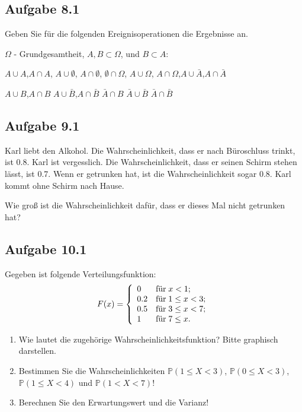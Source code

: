 \documentclass{article}
\begin{document}
	\subsection*{Aufgabe 8.1}
	Geben Sie für die folgenden Ereignisoperationen die Ergebnisse an.
	
	$\Omega$ - Grundgesamtheit, $A, B \subset \Omega$, und $B \subset A$:
	
	$A \cup A$,\quad $A \cap A$, \quad$A \cup \emptyset$, \quad $A \cap
	\emptyset$, \quad$\emptyset \cap \Omega$, \quad$A \cup \Omega$,\quad
	$A \cap \Omega$,\quad$A \cup \bar A$,\quad $A \cap \bar A$\
	
	$A \cup B$,\quad $A \cap B$ \quad
	$A \cup \bar B$,\quad $A \cap \bar B$ \quad
	$\bar A \cap B$ \quad $\bar A \cup \bar B$ \quad $\bar A \cap \bar B$
	
	\subsection*{Aufgabe 9.1}
	Karl liebt den Alkohol. Die Wahrscheinlichkeit, dass er nach Büroschluss trinkt, ist 0.8. Karl ist vergesslich. Die Wahrscheinlichkeit, dass er seinen Schirm stehen lässt, ist 0.7. Wenn er getrunken hat, ist die Wahrscheinlichkeit sogar 0.8. Karl kommt ohne Schirm nach Hause.
	
	Wie groß ist die Wahrscheinlichkeit dafür, dass er dieses Mal nicht getrunken hat?
	
	\subsection*{Aufgabe 10.1}
	Gegeben ist folgende Verteilungsfunktion:
	\begin{equation*}
		F(x) = \left\{ \begin{array}{l@{\quad\text{für}\;}l}
			0   & x < 1;\\
			0.2 & 1 \le x < 3;\\
			0.5 & 3 \le x < 7;\\
			1   & 7 \le x.
		\end{array}\right.
	\end{equation*}
	
	\begin{enumerate}[label = (\alph*)]
		\item Wie lautet die zugehörige Wahrscheinlichkeitsfunktion? Bitte graphisch darstellen.
		\item Bestimmen Sie die Wahrscheinlichkeiten  $\mathbb{P}(1 \le X < 3)$, $\mathbb{P}(0 \le X < 3)$, $\mathbb{P}(1 \le X < 4)$ und  $\mathbb{P}(1 < X < 7)$!
		\item Berechnen Sie den Erwartungswert und die Varianz!
	\end{enumerate}
\end{document}
